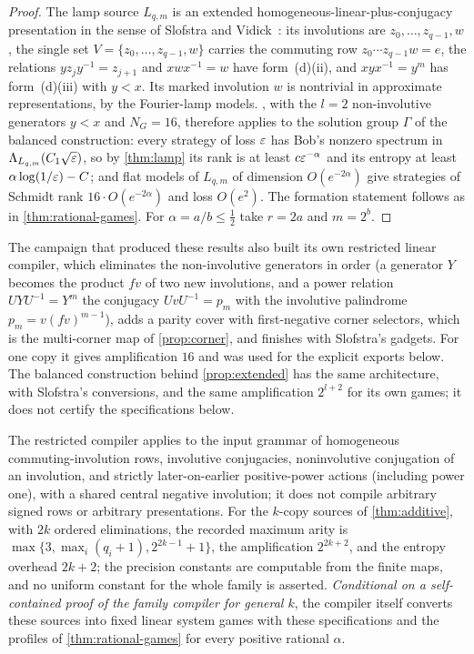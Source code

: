 \begin{proof}
The lamp source $L_{q,m}$ is an extended homogeneous-linear-plus-conjugacy presentation in the sense of Slofstra and
Vidick~\cite[\S6, (a)--(d)]{SV18}: its involutions are $z_0,\dots,z_{q-1},w$, the single set $V=\{z_0,\dots,z_{q-1},w\}$ carries
the commuting row $z_0\cdots z_{q-1}w=e$, the relations $yz_jy^{-1}=z_{j+1}$ and $xwx^{-1}=w$ have form~(d)(ii), and
$xyx^{-1}=y^m$ has form~(d)(iii) with $y<x$. Its marked involution $w$ is nontrivial in approximate representations, by the
Fourier-lamp models. , with the $l=2$ non-involutive generators $y<x$ and $N_G=16$, therefore applies to the solution
group $\Gamma$ of the balanced construction: every strategy of loss $\varepsilon$ has Bob's nonzero spectrum in $\Lambda_{L_{q,m}}(C_1\sqrt{\varepsilon})$,
so by \cref{thm:lamp} its rank is at least $c\varepsilon^{-\alpha}$ and its entropy at least $\alpha\log(1/\varepsilon)-C$; and flat models of $L_{q,m}$ of
dimension $O(e^{-2\alpha})$ give strategies of Schmidt rank $16\cdot O(e^{-2\alpha})$ and loss $O(e^2)$. The formation statement follows as in
\cref{thm:rational-games}. For $\alpha=a/b\le\frac12$ take $r=2a$ and $m=2^b$.
\end{proof}

The campaign that produced these results also built its own restricted linear compiler, which eliminates the non-involutive
generators in order (a generator $Y$ becomes the product $fv$ of two new involutions, and a power relation $UYU^{-1}=Y^m$ the
conjugacy $UvU^{-1}=p_m$ with the involutive palindrome $p_m=v(fv)^{m-1}$), adds a parity cover with first-negative corner
selectors, which is the multi-corner map of \cref{prop:corner}, and finishes with Slofstra's gadgets. For one copy it gives
amplification $16$ and was used for the explicit exports below. The balanced construction behind \cref{prop:extended} has the same
architecture, with Slofstra's conversions, and the same amplification $2^{l+2}$ for its own games; it does not certify the
specifications below.

\begin{theorem}\label{thm:rational-linear-k}
The restricted compiler applies to the input grammar of homogeneous commuting-involution rows, involutive conjugacies,
noninvolutive conjugation of an involution, and strictly later-on-earlier positive-power actions (including power one), with a
shared central negative involution; it does not compile arbitrary signed rows or arbitrary presentations. For the $k$-copy
sources of \cref{thm:additive}, with $2k$ ordered eliminations, the recorded maximum arity is
$\max\{3,\max_i(q_i+1),2^{2k-1}+1\}$, the amplification $2^{2k+2}$, and the entropy overhead $2k+2$; the precision constants are
computable from the finite maps, and no uniform constant for the whole family is asserted. \emph{Conditional on a
self-contained proof of the family compiler for general $k$}, the compiler itself converts these sources into fixed linear
system games with these specifications and the profiles of \cref{thm:rational-games} for every positive rational $\alpha$.
\end{theorem}

